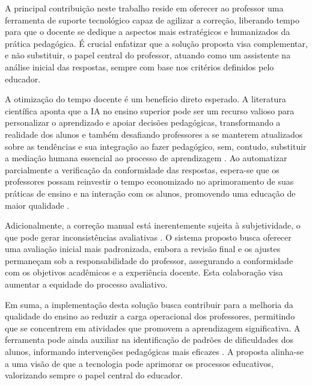  A principal contribuição neste trabalho reside em oferecer ao professor uma ferramenta de suporte tecnológico capaz de agilizar a correção, liberando tempo para que o docente se dedique a aspectos mais estratégicos e humanizados da prática pedagógica. É crucial enfatizar que a solução proposta visa complementar, e não substituir, o papel central do professor, atuando como um assistente na análise inicial das respostas, sempre com base nos critérios definidos pelo educador.

A otimização do tempo docente é um benefício direto esperado. A literatura científica aponta que a IA no ensino superior pode ser um recurso valioso para personalizar o aprendizado e apoiar decisões pedagógicas, transformando a realidade dos alunos e também desafiando professores a se manterem atualizados sobre as tendências e sua integração ao fazer pedagógico, sem, contudo, substituir a mediação humana essencial ao processo de aprendizagem \cite{bottentuit_junior_inteligencia_2024} . Ao automatizar parcialmente a verificação da conformidade das respostas, espera-se que os professores possam reinvestir o tempo economizado no aprimoramento de suas práticas de ensino e na interação com os alunos, promovendo uma educação de maior qualidade \cite{gatti_formacao_2017}.

Adicionalmente, a correção manual está inerentemente sujeita à subjetividade, o que pode gerar inconsistências avaliativas \cite{borges_avaliacao_2017}. O sistema proposto busca oferecer uma avaliação inicial mais padronizada, embora a revisão final e os ajustes permaneçam sob a responsabilidade do professor, assegurando a conformidade com os objetivos acadêmicos e a experiência docente. Esta colaboração visa aumentar a equidade do processo avaliativo.

Em suma, a implementação desta solução busca contribuir para a melhoria da qualidade do ensino ao reduzir a carga operacional dos professores, permitindo que se concentrem em atividades que promovem a aprendizagem significativa. A ferramenta pode ainda auxiliar na identificação de padrões de dificuldades dos alunos, informando intervenções pedagógicas mais eficazes \cite{santos_articulacao_2016}. A proposta alinha-se a uma visão de que a tecnologia pode aprimorar os processos educativos, valorizando sempre o papel central do educador.

